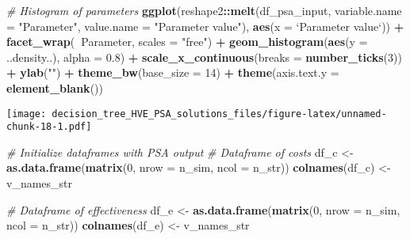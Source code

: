 \documentclass[
]{article}
\newenvironment{Shaded}{\begin{snugshade}}{\end{snugshade}}
\newcommand{\CommentTok}[1]{\textcolor[rgb]{0.56,0.35,0.01}{\textit{#1}}}
\newcommand{\DataTypeTok}[1]{\textcolor[rgb]{0.13,0.29,0.53}{#1}}
\newcommand{\DecValTok}[1]{\textcolor[rgb]{0.00,0.00,0.81}{#1}}
\newcommand{\FloatTok}[1]{\textcolor[rgb]{0.00,0.00,0.81}{#1}}
\newcommand{\KeywordTok}[1]{\textcolor[rgb]{0.13,0.29,0.53}{\textbf{#1}}}
\newcommand{\NormalTok}[1]{#1}
\newcommand{\OperatorTok}[1]{\textcolor[rgb]{0.81,0.36,0.00}{\textbf{#1}}}
\newcommand{\StringTok}[1]{\textcolor[rgb]{0.31,0.60,0.02}{#1}}
\begin{document}
\begin{Shaded}
\begin{Highlighting}[]
\CommentTok{# Histogram of parameters}
\KeywordTok{ggplot}\NormalTok{(reshape2}\OperatorTok{::}\KeywordTok{melt}\NormalTok{(df_psa_input, }\DataTypeTok{variable.name =} \StringTok{"Parameter"}\NormalTok{, }
                      \DataTypeTok{value.name =} \StringTok{"Parameter value"}\NormalTok{), }
                      \KeywordTok{aes}\NormalTok{(}\DataTypeTok{x =} \StringTok{`}\DataTypeTok{Parameter value}\StringTok{`}\NormalTok{)) }\OperatorTok{+}
\StringTok{                      }\KeywordTok{facet_wrap}\NormalTok{(}\OperatorTok{~}\NormalTok{Parameter, }\DataTypeTok{scales =} \StringTok{"free"}\NormalTok{) }\OperatorTok{+}
\StringTok{                      }\KeywordTok{geom_histogram}\NormalTok{(}\KeywordTok{aes}\NormalTok{(}\DataTypeTok{y =}\NormalTok{ ..density..), }\DataTypeTok{alpha =} \FloatTok{0.8}\NormalTok{) }\OperatorTok{+}
\StringTok{                      }\KeywordTok{scale_x_continuous}\NormalTok{(}\DataTypeTok{breaks =} \KeywordTok{number_ticks}\NormalTok{(}\DecValTok{3}\NormalTok{)) }\OperatorTok{+}
\StringTok{                      }\KeywordTok{ylab}\NormalTok{(}\StringTok{""}\NormalTok{) }\OperatorTok{+}
\StringTok{                      }\KeywordTok{theme_bw}\NormalTok{(}\DataTypeTok{base_size =} \DecValTok{14}\NormalTok{) }\OperatorTok{+}
\StringTok{                      }\KeywordTok{theme}\NormalTok{(}\DataTypeTok{axis.text.y =} \KeywordTok{element_blank}\NormalTok{())                    }
\end{Highlighting}
\end{Shaded}

\texttt{[image: decision\_tree\_HVE\_PSA\_solutions\_files/figure-latex/unnamed-chunk-18-1.pdf]}

\begin{Shaded}
\begin{Highlighting}[]
\CommentTok{# Initialize dataframes with PSA output }
\CommentTok{# Dataframe of costs}
\NormalTok{df_c <-}\StringTok{ }\KeywordTok{as.data.frame}\NormalTok{(}\KeywordTok{matrix}\NormalTok{(}\DecValTok{0}\NormalTok{, }
                      \DataTypeTok{nrow =}\NormalTok{ n_sim,}
                      \DataTypeTok{ncol =}\NormalTok{ n_str))}
\KeywordTok{colnames}\NormalTok{(df_c) <-}\StringTok{ }\NormalTok{v_names_str}

\CommentTok{# Dataframe of effectiveness}
\NormalTok{df_e <-}\StringTok{ }\KeywordTok{as.data.frame}\NormalTok{(}\KeywordTok{matrix}\NormalTok{(}\DecValTok{0}\NormalTok{, }
                      \DataTypeTok{nrow =}\NormalTok{ n_sim,}
                      \DataTypeTok{ncol =}\NormalTok{ n_str))}
\KeywordTok{colnames}\NormalTok{(df_e) <-}\StringTok{ }\NormalTok{v_names_str}
\end{Highlighting}
\end{Shaded}
\end{document}
